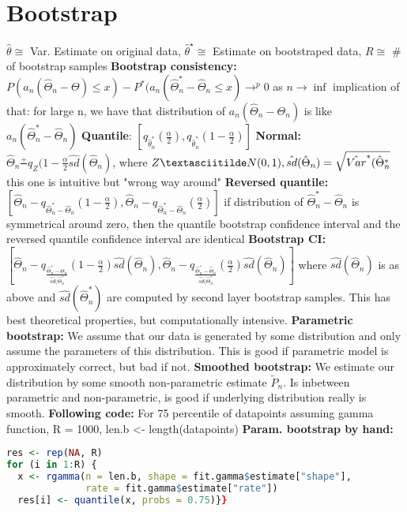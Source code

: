 \section{Bootstrap}
$\hat{\theta} \cong$ Var. Estimate on original data, $\hat{\theta}^\star \cong$ Estimate on bootstraped data, $R \cong$ \# of bootstrap samples
\textbf{Bootstrap consistency: }$P(a_n(\hat\Theta_n-\Theta) \leq x)-P^*(a_n(\hat\Theta_n^*-\hat\Theta_n \leq x) \rightarrow^p 0$ as $n \rightarrow \inf$ implication of that: for large n, we have that distribution of $a_n(\hat\Theta_n - \Theta_n)$ is like $a_n(\hat\Theta^*_n- \hat\Theta_n)$
\textbf{Quantile}: $[q_{\hat\theta_n^*}(\frac{\alpha}{2}),q_{\hat\theta_n^*}(1-\frac{\alpha}{2})]$
\textbf{Normal: }$\hat\Theta_n \frac{+}{} q_Z(1-\frac{\alpha}{2}\hat{sd}(\hat\Theta_n)$, where $Z \textasciitilde N(0,1), \hat{sd}(\hat \Theta_n) = \sqrt{\hat{Var}^*(\hat{\Theta}_n^*}$ this one is intuitive but "wrong way around"
\textbf{Reversed quantile: } $[\hat\Theta_n - q_{\hat\Theta_n^*-\hat\Theta_n}(1-\frac{\alpha}{2}), \hat\Theta_n - q_{\hat\Theta_n^*-\hat\Theta_n}(\frac{\alpha}{2})]$  if distribution of $\hat \Theta_n^*- \hat \Theta_n$ is symmetrical around zero, then the quantile bootstrap confidence interval and the reversed quantile confidence interval are identical 
\textbf{Bootstrap CI: }$[\hat\Theta_n - q_{\frac{\hat\Theta_n^*-\hat\Theta_n}{\hat{sd}(\hat\Theta_n^*}}(1-\frac{\alpha}{2})\hat{sd}(\hat\Theta_n), \hat\Theta_n - q_{\frac{\hat\Theta_n^*-\hat\Theta_n}{\hat{sd}(\hat\Theta_n^*}}(\frac{\alpha}{2})\hat{sd}(\hat\Theta_n)]$ where $\hat{sd}(\hat\Theta_n)$ is as above and $\hat{sd}(\hat\Theta_n^*)$ are computed by second layer bootstrap samples. This has best theoretical properties, but computationally intensive. 
\textbf{Parametric bootstrap: } We assume that our data is generated by some distribution and only assume the parameters of this distribution. This is good if parametric model is approximately correct, but bad if not. 
\textbf{Smoothed bootstrap: } We estimate our distribution by some smooth non-parametric estimate $\tilde P_n$. Is inbetween parametric and non-parametric, is good if underlying distribution really is smooth. 
\textbf{Following code:} For 75 percentile of datapoints assuming gamma function, R = 1000, len.b <- length(datapoints)
\textbf{Param. bootstrap by hand:}
\begin{lstlisting}[language=R]
res <- rep(NA, R)
for (i in 1:R) {
  x <- rgamma(n = len.b, shape = fit.gamma$estimate["shape"],
              rate = fit.gamma$estimate["rate"])
  res[i] <- quantile(x, probs = 0.75)}}
\end{lstlisting}
